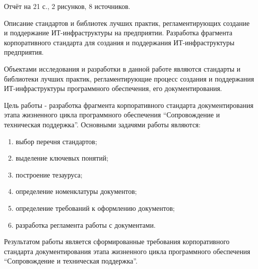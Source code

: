 
\pagebreak
\begin{center}
\end{center}

Отчёт на 21 с., 2 рисунков, 8 источников.


Описание стандартов и библиотек лучших практик, регламентирующих создание и поддержание ИТ-инфраструктуры на предприятии.
Разработка фрагмента корпоративного стандарта для создания и поддержания ИТ-инфраструктуры предприятия.


Объектами исследования и разработки в данной работе являются стандарты и библиотеки лучших практик, регламентирующие процесс создания и поддержания ИТ-инфраструктуры программного обеспечения, его документирования.


Цель работы - разработка фрагмента корпоративного стандарта документирования этапа жизненного цикла программного обеспечения \enquote{Сопровождение и техническая поддержка}.
Основными задачями работы являются:
\begin{enumerate}
    \item выбор перечня стандартов;
    \item выделение ключевых понятий;
    \item построение тезауруса;
    \item определение номенклатуры документов;
    \item определение требований к оформлению документов;
    \item разработка регламента работы с документами.
\end{enumerate}

Результатом работы является сформированные требования корпоративного стандарта документирования этапа жизненного цикла программного обеспечения \enquote{Сопровождение и техническая поддержка}.
